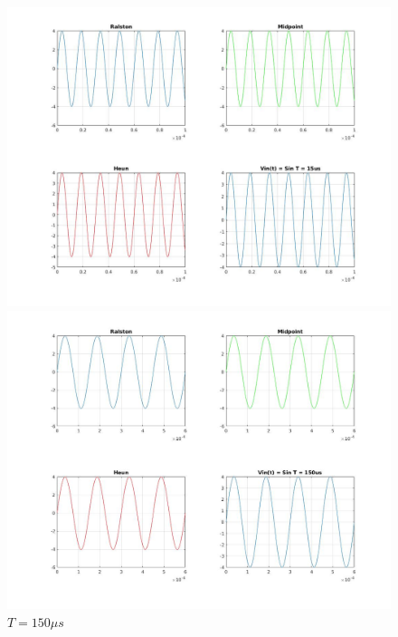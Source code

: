 \documentclass[11pt,a4paper]{article}
\begin{document}
\begin{figure}[h]
	\vspace{-5mm}
	\centering
	\includegraphics[width=.75\textwidth]{Ex1_Figs/sin15.jpg}
	\vspace{-6mm}
	\caption{$T = 15 \mu s$}
	\label{fig:RL4}
	\includegraphics[width=.75\textwidth]{Ex1_Figs/sin150.jpg}
	\vspace{-6mm}
	\caption{$T = 150 \mu s$}
	\label{fig:RL4}
\end{figure}

\pagebreak
\end{document}
